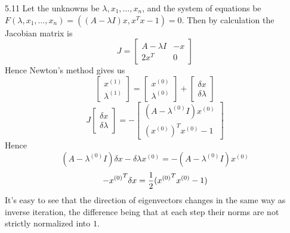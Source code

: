 \documentclass[20pt]{article} %
\theoremstyle{break}
\begin{document}
5.11 Let the unknowns be $\lambda, x_1,\dots, x_n$, and the system of equations be $F(\lambda, x_1,\dots, x_n)=((A-\lambda I)x, x^Tx-1)=0$. Then by calculation the Jacobian matrix is
\[J=\left[\begin{array}{cc} A-\lambda I & -x \\ 2x^T & 0\end{array}\right]\]
Hence Newton's method gives us
\[\left[\begin{array}{c} x^{(1)} \\ \lambda^{(1)}\end{array}\right]=\left[\begin{array}{c} x^{(0)} \\ \lambda^{(0)}\end{array}\right]+\left[\begin{array}{c} \delta x \\ \delta\lambda\end{array}\right]\]
\[J\left[\begin{array}{c} \delta x \\ \delta\lambda\end{array}\right]=-\left[\begin{array}{c} (A-\lambda^{(0)}I)x^{(0)} \\ (x^{(0)})^Tx^{(0)}-1\end{array}\right]\]
Hence
\[(A-\lambda^{(0)}I)\delta x-\delta\lambda x^{(0)}=-(A-\lambda^{(0)}I)x^{(0)}\]
\[-{x^{(0)}}^T\delta x={1\over 2}({x^{(0)}}^Tx^{(0)}-1)\]
It's easy to see that the direction of eigenvectors changes in the same way as inverse iteration, the difference being that at each step their norms are not strictly normalized into $1$.
\end{document}
